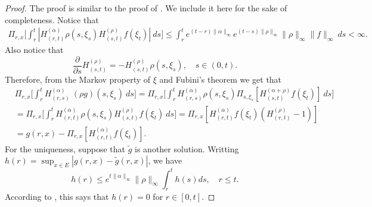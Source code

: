 \documentclass[12pt,a4paper]{amsart}
\theoremstyle{plain}
\theoremstyle{definition}
\numberwithin{equation}{section}
\begin{document}
\begin{proof}
    The proof is similar to the proof of \cite[Lemma A.1.5]{Dynkin1993Superprocesses}. We include it here for the sake of completeness.
    Notice that
\begin{equation}\begin{split}
    \Pi_{r,x} \Big[ \int_r^t | H_{(r,t)}^{(\alpha)}\rho(s,\xi_s) H_{(s,t)}^{(\rho)} f(\xi_t)| ~ds \Big]
    \leq  \int_r^t e^{(t-r)\|\alpha\|_\infty}e^{(t-s)\|\rho\|_\infty}\|\rho\|_\infty\|f\|_\infty ~ds
    < \infty.
\end{split}\end{equation}
    Also notice that
\begin{equation}
\label{eq: crucial for Feynman-Kac}
    \frac{\partial}{\partial s} H^{(\rho)}_{(s,t)}= -H^{(\rho)}_{(s,t)}\rho(s,\xi_s),
    \quad s\in (0,t).
\end{equation}
    Therefore, from the Markov property of $\xi$ and Fubini's theorem we get that
\begin{equation}\begin{split}
    &\Pi_{r,x} \Big[ \int_r^tH_{(r,s)}^{(\alpha)}~(\rho g)(s,\xi_s)~ds \Big]
    =\Pi_{r,x} \Big[ \int_r^t H_{(r,s)}^{(\alpha)}\rho(s,\xi_s) \Pi_{s,\xi_s}[ H_{(s,t)}^{(\alpha+\rho)} f(\xi_t)]~ds \Big]
    \\&= \Pi_{r,x} \Big[ \int_r^t H_{(r,t)}^{(\alpha)}\rho(s,\xi_s) H_{(s,t)}^{(\rho)} f(\xi_t) ~ds \Big]
    = \Pi_{r,x} [ H_{(r,t)}^{(\alpha)}f(\xi_t)(H_{(r,t)}^{(\rho)} - 1)]
    \\&= g(r,x) - \Pi_{r,x} [ H_{(r,t)}^{(\alpha)} f(\xi_t)].
\end{split}\end{equation}
    For the uniqueness, suppose that $\tilde g$ is another solution. Writting $h(r) = \sup_{x\in E}|g(r,x) - \tilde g(r,x)|$, we have
\[
    h(r) \leq e^{t\|\alpha\|_\infty}\|\rho\|_\infty \int_r^t h(s)ds,
    \quad r\le t.
\]
    According to \cite[Lemma A.1.5]{Dynkin1993Superprocesses}, this says that $h(r) =  0$ for $r\in [0,t]$.
\end{proof}
\end{document}
